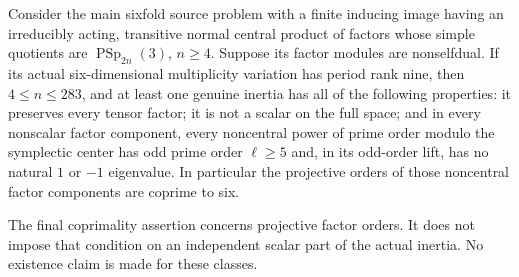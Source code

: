 \begin{corollary}
\label{D-HOS-19}
Consider the main sixfold source problem with a finite inducing
image having an irreducibly acting, transitive normal central
product of factors whose simple quotients are
$\operatorname{PSp}_{2n}(3)$, $n\ge4$. Suppose its factor modules
are nonselfdual. If its actual six-dimensional multiplicity
variation has period rank nine, then $4\le n\le283$, and at
least one genuine inertia has all of the following properties:
it preserves every tensor factor; it is not a scalar on the full
space; and in every nonscalar factor component, every noncentral
power of prime order modulo the symplectic center has odd prime
order $\ell\ge5$ and, in its odd-order lift, has no natural
$1$ or $-1$ eigenvalue. In particular the projective orders of
those noncentral factor components are coprime to six.

The final coprimality assertion concerns projective factor orders.
It does not impose that condition on an independent scalar part
of the actual inertia. No existence claim is made for these classes.
\end{corollary}

